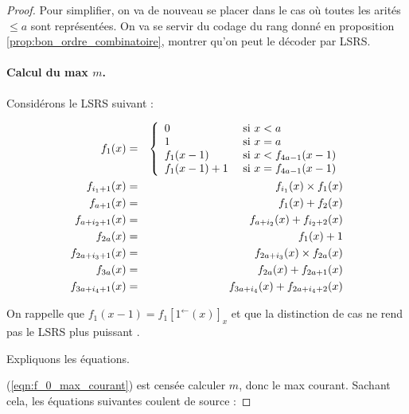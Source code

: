 \documentclass{report}
\newcommand{\eqpred}[3]{#1\left[ #2^{\leftarrow}(#3) \right]_{#3}}
\begin{document}
	\begin{proof}
		Pour simplifier, on va de nouveau se placer dans le cas où toutes les arités $\leqslant a$ sont représentées\footnotemark. On va se servir du codage du rang donné en proposition \ref{prop:bon_ordre_combinatoire}, montrer qu'on peut le décoder par LSRS.
		
			
		\paragraph{Calcul du max $m$.}\label{par:calcul_max_bon_ordre}
			Considérons le LSRS suivant :
			
				\begin{eqnarray}
					f_1(x) & = & \left\lbrace \begin{array}{ll} 	
									0 & \text{ si $x < a$} \\
									1 & \text{ si $x = a$} \\
									f_1(x-1) & \text{ si $x < f_{4a-1}(x-1)$} \\
									f_1(x-1)+1 & \text{ si $x = f_{4a-1}(x-1)$}
									 \end{array} \right. 
									\label{eqn:f_0_max_courant}\\
					f_{i_1 + 1}(x) & = & f_{i_1}(x) \times f_1(x) \label{eqn:m_pow_i}\\
					f_{a + 1}(x) & = & f_{1}(x) + f_{2}(x) \label{eqn:sum_m_pow_init}\\
					f_{a + i_2 + 1}(x) & = & f_{a + i_2}(x) + f_{i_2 + 2}(x) \label{eqn:sum_m_pow}\\
					f_{2a}(x) & = & f_1(x) + 1 \label{eqn:m_plus_1}\\
					f_{2a + i_3 + 1}(x) & = & f_{2a + i_3}(x) \times f_{2a}(x) \label{eqn:m1_pow_i}\\
					f_{3a}(x) & = & f_{2a}(x) + f_{2a + 1}(x) \label{eqn:sum_m1_pow_init}\\
					f_{3a + i_4 + 1}(x) & = & f_{3a + i_4}(x) + f_{2a + i_4+2}(x) \label{eqn:sum_m1_pow}
				\end{eqnarray}
		
			On rappelle que $f_1(x-1) = \eqpred{f_1}{1}{x}$ et que la distinction de cas ne rend pas le LSRS plus puissant \cite{GrandjeanSchwentick2002}. 
			
			Expliquons les équations.
			
			(\ref{eqn:f_0_max_courant}) est censée calculer $m$, donc le max courant. Sachant cela, les équations suivantes coulent de source : 
			

\end{proof}
\end{document}
